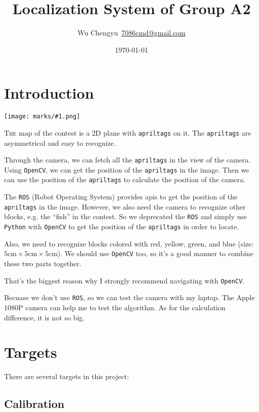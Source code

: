 \documentclass{article}
\title{Localization System of Group A2}
\author{Wu Chengyu\ \url{7086cmd@gmail.com}}
\date{\today}
\newcommand{\apriltag}[1]{
    \texttt{[image: marks/\#1.png]}
}
\begin{document}
\maketitle

\newpage

\tableofcontents

\newpage

\section{Introduction}

\apriltag{001}

\lettrine{T}{he} map of the contest is a 2D plane with \texttt{apriltags} on it. The \texttt{apriltags} are asymmetrical and easy to recognize.

Through the camera, we can fetch all the \texttt{apriltags} in the view of the camera. Using \texttt{OpenCV}, we can get the position of the \texttt{apriltags} in the image. Then we can use the position of the \texttt{apriltags} to calculate the position of the camera.

The \texttt{ROS} (Robot Operating System) provides apis to get the position of the \texttt{apriltags} in the image. However, we also need the camera to recognize other blocks, e.g. the ``fish'' in the contest. So we deprecated the \texttt{ROS} and simply use \texttt{Python} with \texttt{OpenCV} to get the position of the \texttt{apriltags} in order to locate.

Also, we need to recognize blocks colored with red, yellow, green, and blue (size: $5\mathrm{cm}\times5\mathrm{cm}\times5\mathrm{cm}$). We should use \texttt{OpenCV} too, so it's a good manner to combine these two parts together.

That's the biggest reason why I strongly recommend navigating with \texttt{OpenCV}.

Becuase we don't use \texttt{ROS}, so we can test the camera with my laptop. The Apple 1080P camera can help me to test the algorithm. As for the calculation difference, it is not so big.


\section{Targets}

There are several targets in this project:

\subsection{Calibration}
\end{document}
